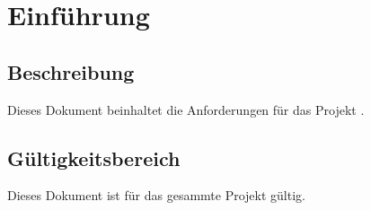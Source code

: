 \chapter{Einführung}

\section{Beschreibung}
Dieses Dokument beinhaltet die Anforderungen für das Projekt \project.

\section{Gültigkeitsbereich}
Dieses Dokument ist für das gesammte Projekt \project gültig.
